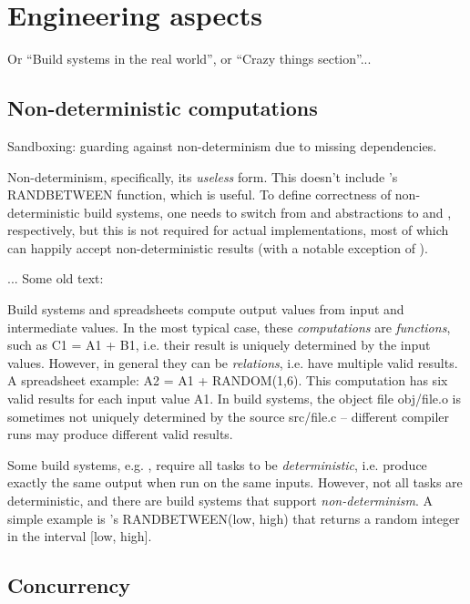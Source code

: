 \clearpage
\section{Engineering aspects}\label{sec-engineering}

Or ``Build systems in the real world'', or ``Crazy things section''...

\subsection{Non-deterministic computations}\label{sec-non-determinism}

Sandboxing: guarding against non-determinism due to missing dependencies.


Non-determinism, specifically, its \emph{useless} form. This doesn't
include \Excel's \textsf{RANDBETWEEN} function, which is useful.
To define correctness of non-deterministic build systems, one needs to
switch from  and  abstractions to
 and , respectively, but this is not
required for actual implementations, most of which can happily accept
non-deterministic results (with a notable exception of \Buck).

... Some old text:

Build systems and spreadsheets compute output values from input and intermediate
values. In the most typical case, these \emph{computations} are \emph{functions},
such as \textsf{C1 = A1 + B1}, i.e. their result is uniquely determined by the
input values. However, in general they can be \emph{relations}, i.e. have
multiple valid results. A spreadsheet example: \textsf{A2 = A1 + RANDOM(1,6)}.
This computation has six valid results for each input value \textsf{A1}. In
build systems, the object file \textsf{obj/file.o} is sometimes not uniquely
determined by the source \textsf{src/file.c} -- different compiler runs may
produce different valid results.

Some build systems, e.g. \Buck, require all tasks to be
\emph{deterministic}, i.e. produce exactly the same output when run on the
same inputs. However, not all tasks are deterministic, and there are build
systems that support \emph{non-determinism}. A simple example is \Excel's
\textsf{RANDBETWEEN(low, high)} that returns a random integer in the
interval \textsf{[low, high]}.

\subsection{Concurrency}\label{sec-concurrency}

